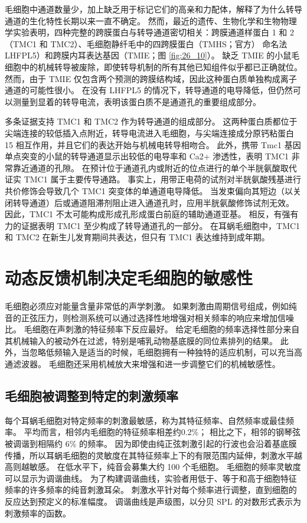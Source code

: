 毛细胞中通道数量少，加上缺乏用于标记它们的高亲和力配体，解释了为什么转导通道的生化特性长期以来一直不确定。 
然而，最近的遗传、生物化学和生物物理学实验表明，四种完整的跨膜蛋白与转导通道密切相关：跨膜通道样蛋白 1 和 2（TMC1 和 TMC2）、毛细胞静纤毛中的四跨膜蛋白（TMHS；官方） 命名法 LHFPL5）和跨膜内耳表达基因（TMIE；图 \ref{fig:26_10}）。 
缺乏 TMIE 的小鼠毛细胞中的机械转导被废除，即使转导机制的所有其他已知组件似乎都已正确就位。 
然而，由于 TMIE 仅包含两个预测的跨膜结构域，因此这种蛋白质单独构成离子通道的可能性很小。 
在没有 LHFPL5 的情况下，转导通道的电导降低，但仍然可以测量到显着的转导电流，表明该蛋白质不是通道孔的重要组成部分。


多条证据支持 TMC1 和 TMC2 作为转导通道的组成部分。 
这两种蛋白质都位于尖端连接的较低插入点附近，转导电流进入毛细胞，与尖端连接成分原钙粘蛋白 15 相互作用，并且它们的表达开始与机械电转导相吻合。 
此外，携带 Tmc1 基因单点突变的小鼠的转导通道显示出较低的电导率和 Ca2+ 渗透性，表明 TMC1 非常靠近通道的孔隙。 
在预计位于通道孔内或附近的位点进行的单个半胱氨酸取代证实 TMC1 属于主要传导通路。 
事实上，用带正电荷的试剂对半胱氨酸残基进行共价修饰会导致几个 TMC1 突变体的单通道电导降低。 
当发束偏向其短边（以关闭转导通道）后或通道阻滞剂阻止进入通道孔时，应用半胱氨酸修饰试剂无效。 
因此，TMC1 不太可能构成形成孔形成蛋白前庭的辅助通道亚基。 
相反，有强有力的证据表明 TMC1 至少构成了转导通道孔的一部分。 
在耳蜗毛细胞中，TMC1 和 TMC2 在新生儿发育期间共表达，但只有 TMC1 表达维持到成年期。


\section{动态反馈机制决定毛细胞的敏感性}
毛细胞必须应对能量含量非常低的声学刺激。 如果刺激由周期信号组成，例如纯音的正弦压力，则检测系统可以通过选择性地增强对相关频率的响应来增加信噪比。 毛细胞在声刺激的特征频率下反应最好。 给定毛细胞的频率选择性部分来自其机械输入的被动外在过滤，特别是哺乳动物基底膜的同位素排列的结果。 此外，当忽略低频输入是适当的时候，毛细胞拥有一种独特的适应机制，可以充当高通滤波器。 毛细胞还采用机械放大来增强和进一步调整它们的机械敏感性。

\subsection{毛细胞被调整到特定的刺激频率}
每个耳蜗毛细胞对特定频率的刺激最敏感，称为其特征频率、自然频率或最佳频率。 平均而言，相邻内毛细胞的特征频率相差约0.2\%； 相比之下，相邻的钢琴弦被调谐到相隔约 6\% 的频率。 因为即使由纯正弦刺激引起的行波也会沿着基底膜传播，所以耳蜗毛细胞的灵敏度在其特征频率上下的有限范围内延伸，刺激水平越高则越敏感。 在低水平下，纯音会募集大约 100 个毛细胞。 毛细胞的频率灵敏度可以显示为调谐曲线。 为了构建调谐曲线，实验者用低于、等于和高于细胞特征频率的许多频率的纯音刺激耳朵。 刺激水平针对每个频率进行调整，直到细胞的反应达到预定义的标准幅度。 调谐曲线是声级图，以分贝 SPL 的对数形式表示为刺激频率的函数。

